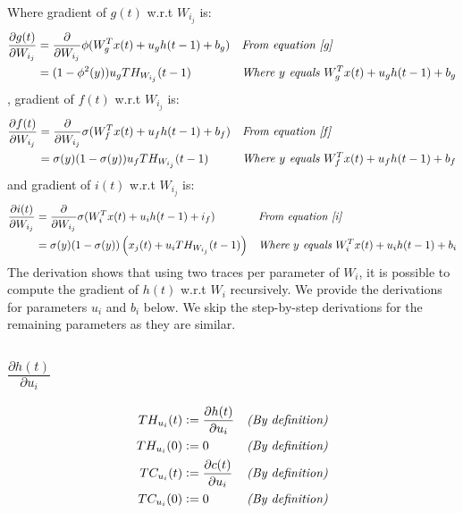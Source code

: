 \documentclass{article}
\begin{document}
Where gradient of $g(t)$  w.r.t $W_{i_j}$ is:
\begin{align*}
\frac{\partial g(t)}{\partial W_{i_j}} &=  \frac{\partial}{\partial W_{i_j}} \phi(W_{g}^T x(t) + u_{g} h(t-1) + b_g) && \textit{From equation \ref{g}} \\
&= (1-\phi^2(y))u_g TH_{W_{i_j}}(t-1) && \textit{Where $y$ equals $W_{g}^T x(t) + u_{g} h(t-1) + b_g$} \\
\end{align*}
, gradient of $f(t)$  w.r.t $W_{i_j}$ is:
\begin{align*}
\frac{\partial f(t)}{\partial W_{i_j}} &=  \frac{\partial}{\partial W_{i_j}} \sigma(W_{f}^T x(t) + u_{f} h(t-1) + b_f) && \textit{From equation \ref{f}} \\
&= \sigma(y)(1-\sigma(y))u_f TH_{W_{i_j}}(t-1) && \textit{Where $y$ equals $W_{f}^T x(t) + u_{f} h(t-1) + b_f$} \\
\end{align*}
and gradient of $i(t)$ w.r.t $W_{i_j}$ is:
\begin{align*}
\frac{\partial i(t)}{\partial W_{i_j}} &=  \frac{\partial}{\partial W_{i_j}} \sigma(W_{i}^T x(t) + u_{i} h(t-1) + i_f) && \textit{From equation \ref{i}} \\
&= \sigma(y)(1-\sigma(y)) \left (x_j(t)+ u_i TH_{W_{i_j}}(t-1) \right )&& \textit{Where $y$ equals $W_{i}^T x(t) + u_{i} h(t-1) + b_i$} \\
\end{align*}
The derivation shows that using two traces per parameter of $W_i$, it is possible to compute the gradient of $h(t)$ w.r.t $W_i$ recursively. We provide the derivations for parameters $u_i$ and $b_i$ below. We skip the step-by-step derivations for the remaining parameters as they are similar. 

\subsection{$\frac{\partial h(t)}{\partial u_i}$}

\begin{align}
TH_{u_{i}}(t)  & \vcentcolon = \frac{\partial h(t)}{\partial u_i}  && \textit{(By definition)}  \label{thu}\\
TH_{u_{i}}(0)  & \vcentcolon = 0  && \textit{(By definition)}  \\
TC_{u_{i}}(t)  & \vcentcolon = \frac{\partial c(t)}{\partial u_i}  && \textit{(By definition)}  \label{tcu} \\
TC_{u_{i}}(0)  & \vcentcolon = 0  && \textit{(By definition)} 
\end{align}
\end{document}

